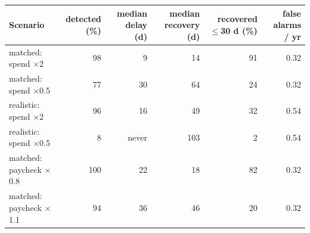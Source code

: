 \begin{tabular}{l rrrrr}
\toprule
Scenario & detected (\%) & median delay (d) & median recovery (d) & recovered $\leq$30 d (\%) & false alarms / yr\\
\midrule
matched: spend $\times$2 & 98 & 9 & 14 & 91 & 0.32 \\
matched: spend $\times$0.5 & 77 & 30 & 64 & 24 & 0.32 \\
realistic: spend $\times$2 & 96 & 16 & 49 & 32 & 0.54 \\
realistic: spend $\times$0.5 & 8 & never & 103 & 2 & 0.54 \\
matched: paycheck $\times$0.8 & 100 & 22 & 18 & 82 & 0.32 \\
matched: paycheck $\times$1.1 & 94 & 36 & 46 & 20 & 0.32 \\
\bottomrule
\end{tabular}
